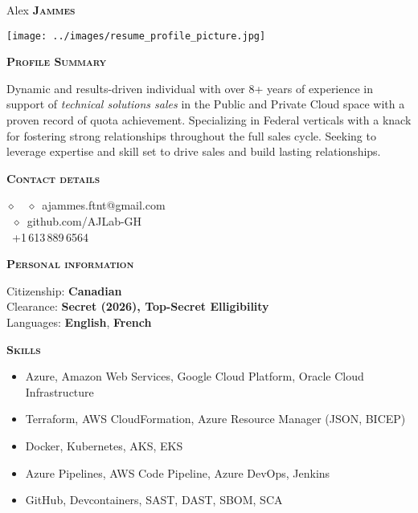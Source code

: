 \documentclass[11pt, a4paper]{article}
\newcommand{\small}[1]{{\small$\diamond$\ #1}}
\newcommand{\headleft}[1]{\vspace*{3ex}\textsc{\textbf{#1}}\par%
    \vspace*{-1.5ex}\hrulefill\par\vspace*{0.7ex}}
\begin{document}
\setlength{\topskip}{0pt}
\setlength{\parindent}{0pt}
\setlength{\parskip}{0pt}
\setlength{\fboxsep}{0pt}
\pagestyle{empty}
\raggedbottom

\begin{minipage}[t]{0.28\textwidth} %
\colorbox{cvblue}{\begin{minipage}[t][5mm][t]{\textwidth}\null\hfill\null\end{minipage}}

\vspace{-.2ex} %
\colorbox{cvblue!90}{\color{white}  %
\textwidth\relax%
\begin{minipage}[t][293mm][t]{0.82\textwidth}
\raggedright
\vspace*{2.5ex}

\Large Alex \textbf{\textsc{Jammes}} \normalsize

\null\hfill\texttt{[image: ../images/resume\_profile\_picture.jpg]}\hfill\null

\vspace*{0.5ex} %

\headleft{Profile Summary}
Dynamic and results-driven individual with over 8+ years of experience in support of \textit{ technical solutions sales} in the Public and Private Cloud space with a proven record of quota achievement. Specializing in Federal verticals with a knack for fostering strong relationships throughout the full sales cycle. Seeking to leverage expertise and skill set to drive sales and build lasting relationships.

\headleft{Contact details}
\small %
\MVAt\ {\small ajammes.ftnt@gmail.com} \\[0.4ex]
\faGithub\ {\small github.com/AJLab-GH}\\[0.2ex]
\Mobilefone\ +1\,613\,889\,6564\,\\

\normalsize

\headleft{Personal information}
Citizenship: \textbf{Canadian} \\[0.5ex]
Clearance: \textbf{Secret (2026), Top-Secret Elligibility} \\[0.5ex]
Languages: \textbf{English}, \textbf{French}

\headleft{Skills}
\begin{itemize}
\item Azure, Amazon Web Services, Google Cloud Platform, Oracle Cloud Infrastructure
\item Terraform, AWS CloudFormation, Azure Resource Manager (JSON, BICEP)
\item Docker, Kubernetes, AKS, EKS
\item Azure Pipelines, AWS Code Pipeline, Azure DevOps, Jenkins
\item GitHub, Devcontainers, SAST, DAST, SBOM, SCA
\end{itemize}


\end{minipage}}
\end{minipage}
\end{document}
